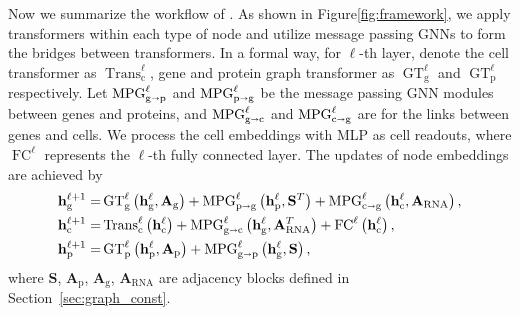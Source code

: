 Now we summarize the workflow of \method{}. As shown in Figure\ref{fig:framework}, we apply transformers within each type of node and utilize message passing GNNs to form the bridges between transformers. In a formal way, for $\ell$-th layer, denote the cell transformer as $\operatorname{Trans}^{\ell}_{\text{c}}$, gene and protein graph transformer as $\operatorname{GT}^{\ell}_{\text{g}}$ and $\operatorname{GT}^{\ell}_{\text{p}}$ respectively. Let $\operatorname{MPG}^{\ell}_{\text{g} \shortrightarrow \text{p}}$ and $\operatorname{MPG}^{\ell}_{\text{p} \shortrightarrow \text{g}}$ be the message passing GNN modules between genes and proteins, and $\operatorname{MPG}^{\ell}_{\text{g} \shortrightarrow \text{c}}$ and $\operatorname{MPG}^{\ell}_{\text{c} \shortrightarrow \text{g}}$ are for the links between genes and cells. We process the cell embeddings with MLP as cell readouts, where $\operatorname{FC}^{\ell}$ represents the $\ell$-th fully connected layer. The updates of node embeddings are achieved by 
\begin{equation}\label{eq:fusion}
    \begin{split}
        \mathbf{h}_{\text{g}}^{\ell+1} =& \operatorname{GT}_{\text{g}}^{\ell}\left(\mathbf{h}_{\text{g}}^{\ell}, \mathbf{A}_{\text{g}}\right)  + \operatorname{MPG}^{\ell}_{\text{p} \shortrightarrow \text{g}}\left(\mathbf{h}_{\text{p}}^{\ell}, \mathbf{S}^T\right) + \operatorname{MPG}^{\ell}_{\text{c} \shortrightarrow \text{g}}\left(\mathbf{h}_{\text{c}}^{\ell}, \mathbf{A}_{\text{RNA}}\right), \\
        \mathbf{h}_{\text{c}}^{\ell+1} =& \operatorname{Trans}^{\ell}_{\text{c}}\left(\mathbf{h}_{\text{c}}^{\ell}\right) + \operatorname{MPG}^{\ell}_{\text{g} \shortrightarrow \text{c}}\left(\mathbf{h}_{\text{g}}^{\ell}, \mathbf{A}_{\text{RNA}}^T\right) + \operatorname{FC}^{\ell}\left(\mathbf{h}_{\text{c}}^{\ell}\right), \\
        \mathbf{h}_{\text{p}}^{\ell+1} =& \operatorname{GT}_{\text{p}}^{\ell}\left(\mathbf{h}_{\text{p}}^{\ell}, \mathbf{A}_{\text{p}}\right) + \operatorname{MPG}^{\ell}_{\text{g} \shortrightarrow \text{p}}\left(\mathbf{h}_{\text{g}}^{\ell}, \mathbf{S}\right), 
    \end{split}
\end{equation}
where $\mathbf{S}$, $\mathbf{A}_{\text{p}}$, $\mathbf{A}_{\text{g}}$, $\mathbf{A}_{\text{RNA}}$ are adjacency blocks defined in Section~\ref{sec:graph_const}. 

